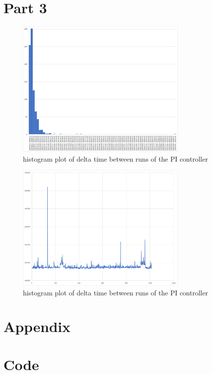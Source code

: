 \documentclass{article}
\begin{document}
\section{Part 3}

\begin{figure}[h!]
    \centering
    \includegraphics[width=0.75\textwidth]{Project4KernelSpaceEncoderDriver/histogram_timebetweenruns.png}
    \caption{histogram plot of delta time between runs of the PI controller}
    \label{fig:histogramDelta}
\end{figure}
\begin{figure}[h!]
    \centering
    \includegraphics[width=0.75\textwidth]{Project4KernelSpaceEncoderDriver/scatterplot_between_runs.png}
    \caption{histogram plot of delta time between runs of the PI controller}
    \label{fig:scatterplotDelta}
\end{figure}
\newpage
\section*{Appendix}
\appendix

\newpage
\section{Code}\label{appendix:code}






\end{document}
